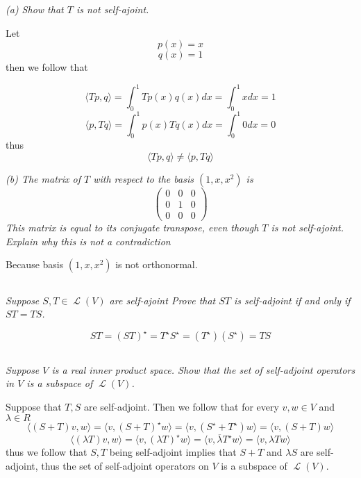 \documentclass[11pt,oneside,titlepage]{book}
\DeclareMathOperator \map {\mathcal {L}}
\newcommand{\eangle}[1]{\langle #1 \rangle}
\begin{document}
\textit{(a) Show that $T$ is not self-ajoint.}

Let
$$p(x) = x$$
$$q(x) = 1$$
then we follow that

$$\eangle{Tp, q} = \int_0^1{Tp(x) q(x) dx} = \int_0^1{x dx} = 1$$
$$\eangle{p, Tq} = \int_0^1{p(x) Tq(x) dx} = \int_0^1{0 dx} = 0$$
thus
$$\eangle{Tp, q} \neq \eangle{p, Tq}$$

\textit{(b) The matrix of $T$ with respect to the basis $(1, x, x^2)$ is 
$$
\begin{pmatrix}
  0 & 0 & 0 \\
  0 & 1 & 0 \\
  0 & 0 & 0
\end{pmatrix}
$$
This matrix is equal to its conjugate transpose, even though $T$ is not self-ajoint. Explain
why this is not a contradiction}

Because basis $(1, x, x^2)$ is not orthonormal.

\subsection{}

\textit{Suppose $S, T \in \map(V)$ are self-ajoint Prove that $ST$ is self-adjoint if
  and only if $ST = TS$.}

$$ST = (ST)^\star = T^\star S^\star = (T^\star) (S^\star) = TS$$

\subsection{}

\textit{Suppose $V$ is a real inner product space. Show that the set of self-adjoint operators
  in $V$ is a subspace of $\map(V)$.}

Suppose that $T, S$ are self-adjoint. Then we follow that for every $v, w \in V$ and
$\lambda \in R$
$$\eangle{(S + T)v, w} = \eangle{v, (S + T)^\star w} =  \eangle{v, (S^\star + T^\star) w} =
\eangle{v, (S + T) w}$$
$$\eangle{(\lambda T)v, w} = \eangle{v, (\lambda T)^\star w} =  \eangle{v, \overline{\lambda} T^\star w} =   \eangle{v, \lambda T w}$$
thus we follow that $S, T$ being self-adjoint implies that $S + T$ and $\lambda S$ are
self-adjoint, thus the set of self-adjoint operators on $V$ is a subspace of $\map(V)$.

\subsection{}
\end{document}
